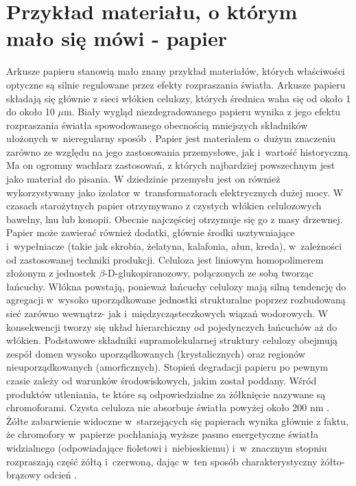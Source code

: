 \section{Przykład materiału, o którym mało się mówi - papier}
\indent Arkusze papieru stanowią mało znany przykład materiałów, których właściwości optyczne są silnie regulowane przez efekty rozpraszania światła. Arkusze papieru składają się głównie z sieci włókien celulozy, których średnica waha się od około 1 do około 10 $\mu$m. Biały wygląd niezdegradowanego papieru wynika z jego efektu rozpraszania światła spowodowanego obecnością mniejszych składników ułożonych w~nieregularny sposób \cite{missori2004optical}. Papier jest materiałem o~dużym znaczeniu zarówno ze względu na jego zastosowania przemysłowe, jak i~wartość historyczną. Ma on ogromny wachlarz zastosowań, z których najbardziej powszechnym jest jako materiał do pisania. W dziedzinie przemysłu jest on również wykorzystywany jako izolator w~transformatorach elektrycznych dużej mocy. W czasach starożytnych papier otrzymywano z czystych włókien celulozowych bawełny, lnu lub konopii. Obecnie najczęściej otrzymuje się go z masy drzewnej. Papier może zawierać również dodatki, głównie środki usztywniające i~wypełniacze (takie jak skrobia, żelatyna, kalafonia, ałun, kreda), w~zależności od zastosowanej techniki produkcji. Celuloza jest liniowym homopolimerem złożonym z jednostek $\beta$-D-glukopiranozowy, połączonych ze sobą tworząc łańcuchy. Włókna powstają, ponieważ łańcuchy celulozy mają silną tendencję do agregacji w~wysoko uporządkowane jednostki strukturalne poprzez rozbudowaną sieć zarówno wewnątrz- jak i~międzycząsteczkowych wiązań wodorowych. W konsekwencji tworzy się układ hierarchiczny od pojedynczych łańcuchów aż do włókien. Podstawowe składniki supramolekularnej struktury celulozy obejmują zespół domen wysoko uporządkowanych (krystalicznych) oraz regionów nieuporządkowanych (amorficznych). Stopień degradacji papieru po pewnym czasie zależy od warunków środowiskowych, jakim został poddany. Wśród produktów utleniania, te które są odpowiedzialne za żółknięcie nazywane są chromoforami. Czysta celuloza nie absorbuje światła powyżej około 200 nm \cite{missori2006modifications}. Żółte zabarwienie widoczne w~starzejących się papierach wynika głównie z faktu, że chromofory w~papierze pochłaniają wyższe pasmo energetyczne światła widzialnego (odpowiadające fioletowi i~niebieskiemu) i~w~znacznym stopniu rozpraszają część żółtą i~czerwoną, dając w~ten sposób charakterystyczny żółto-brązowy odcień \cite{missori2004optical, missori2006modifications}.
